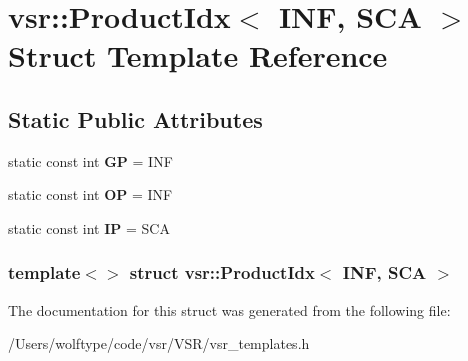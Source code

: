 \hypertarget{structvsr_1_1_product_idx_3_01_i_n_f_00_01_s_c_a_01_4}{\section{vsr\-:\-:Product\-Idx$<$ I\-N\-F, S\-C\-A $>$ Struct Template Reference}
\label{structvsr_1_1_product_idx_3_01_i_n_f_00_01_s_c_a_01_4}
}
\subsection*{Static Public Attributes}
\begin{DoxyCompactItemize}
\item 
\hypertarget{structvsr_1_1_product_idx_3_01_i_n_f_00_01_s_c_a_01_4_a0f5265afd6dfaf42b4a8f7a1ff4bade4}{static const int {\bfseries G\-P} = I\-N\-F}\label{structvsr_1_1_product_idx_3_01_i_n_f_00_01_s_c_a_01_4_a0f5265afd6dfaf42b4a8f7a1ff4bade4}

\item 
\hypertarget{structvsr_1_1_product_idx_3_01_i_n_f_00_01_s_c_a_01_4_ab1ac1a036ece90b19ea05c0aaff8fe0e}{static const int {\bfseries O\-P} = I\-N\-F}\label{structvsr_1_1_product_idx_3_01_i_n_f_00_01_s_c_a_01_4_ab1ac1a036ece90b19ea05c0aaff8fe0e}

\item 
\hypertarget{structvsr_1_1_product_idx_3_01_i_n_f_00_01_s_c_a_01_4_ab6382995c254aa8a38012ea5db0f30cc}{static const int {\bfseries I\-P} = S\-C\-A}\label{structvsr_1_1_product_idx_3_01_i_n_f_00_01_s_c_a_01_4_ab6382995c254aa8a38012ea5db0f30cc}

\end{DoxyCompactItemize}
\subsubsection*{template$<$$>$ struct vsr\-::\-Product\-Idx$<$ I\-N\-F, S\-C\-A $>$}



The documentation for this struct was generated from the following file\-:\begin{DoxyCompactItemize}
\item 
/\-Users/wolftype/code/vsr/\-V\-S\-R/vsr\-\_\-templates.\-h\end{DoxyCompactItemize}
